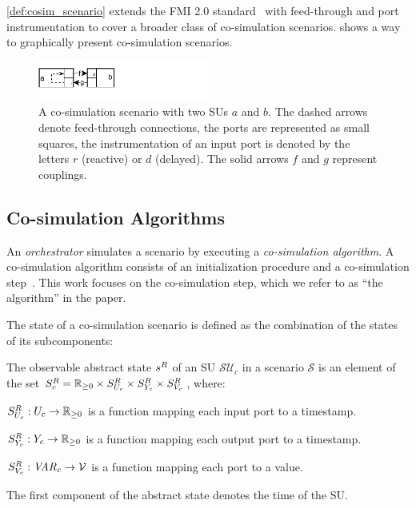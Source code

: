 \cref{def:cosim_scenario} extends the FMI 2.0 standard~\cite{FMI2014} with feed-through and port instrumentation to cover a broader class of co-simulation scenarios. 
 shows a way to graphically present co-simulation scenarios.

\begin{figure}[htb]
  \centering
  \includegraphics[width=0.5\textwidth]{images/simple_example.pdf}
  \caption{A co-simulation scenario with two SUs $a$ and $b$. 
  The dashed arrows denote feed-through connections, the ports are represented as small squares, the instrumentation of an input port is denoted by the letters $r$ (reactive) or $d$ (delayed).
  The solid arrows $f$ and $g$ represent couplings.}
  \label{fig:simpleexample}  
\end{figure}


\subsection{Co-simulation Algorithms}\label{sc:cosimalgo}
An \emph{orchestrator} simulates a scenario by executing a \emph{co-simulation algorithm}.
A co-simulation algorithm consists of an initialization procedure and a co-simulation step~\cite{FMI2014}.
This work focuses on the co-simulation step, which we refer to as ``the algorithm'' in the paper.

The state of a co-simulation scenario is defined as the combination of the states of its subcomponents:

\begin{definition}\label{def:runtime_state}
  The observable abstract state $s^{R}_{}$ of an SU $\mathcal{SU}_c$ in a scenario $\mathcal{S}$ is an element of the set $S^{R}_{c} = \mathbb{R}_{\geq 0} \times S^{R}_{U_{c}} \times S^{R}_{Y_{c}} \times S^{R}_{V_c}$, where:
  \begin{compactitem}
    \item $S^{R}_{U_{c}} : U_{c} \to \mathbb{R}_{\geq 0}$ is a function mapping each input port to a timestamp.  
    \item $S^{R}_{Y_{c}} : Y_{c} \to \mathbb{R}_{\geq 0}$ is a function mapping each output port to a timestamp.  
    \item $S^{R}_{V_c} : \mathit{VAR_{c}} \to \mathcal{V}$ is a function mapping each port to a value.  
  \end{compactitem}
  The first component of the abstract state denotes the time of the SU.
\end{definition}

